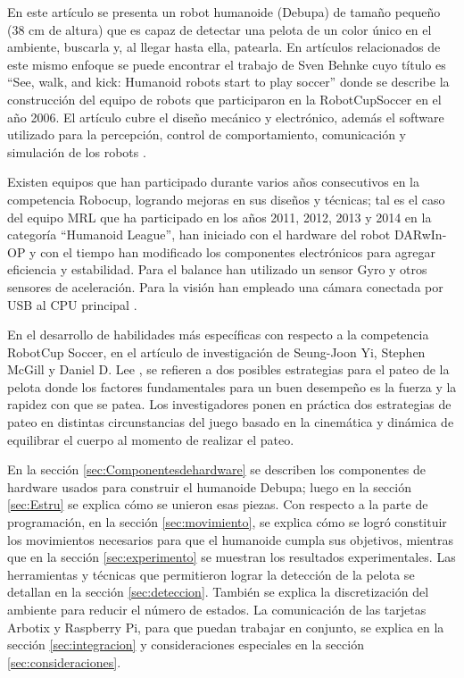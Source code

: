 \documentclass[conference, letterpaper]{IEEEtranMC1}
\begin{document}
En este artículo se presenta un robot humanoide (Debupa) de tamaño pequeño (38 cm de altura) que es capaz de detectar una pelota de un color único en el ambiente, buscarla y, al llegar hasta ella, patearla. En artículos relacionados de este mismo enfoque se puede encontrar el trabajo de Sven Behnke cuyo título es “See, walk, and kick: Humanoid robots start to play soccer” donde se describe la construcción del equipo de robots que participaron en la RobotCupSoccer en el a\~no 2006. El artículo cubre el diseño mecánico y electrónico, además el software utilizado para la percepción, control de comportamiento, comunicación y simulación de los robots \cite{paper}. 

Existen equipos que han participado durante varios años consecutivos en la competencia Robocup, logrando mejoras en sus diseños y técnicas; tal es el caso del equipo MRL que ha participado en los años 2011, 2012, 2013 y 2014 en la categoría “Humanoid League”, han iniciado con el hardware del robot DARwIn-OP y con el tiempo han modificado los componentes electrónicos para agregar eficiencia y estabilidad. Para el balance han utilizado un sensor Gyro y otros sensores de aceleración. Para la visión han empleado una cámara conectada por USB al CPU principal \cite{paper1}. 

En el desarrollo de habilidades más específicas con respecto a la competencia RobotCup Soccer, en el artículo de investigación de Seung-Joon Yi, Stephen McGill y Daniel D. Lee  \cite{paper2}, se refieren a dos posibles estrategias para el pateo de la pelota donde los factores fundamentales para un buen desempeño es la fuerza y la rapidez con que se patea. Los investigadores ponen en pr\'actica dos estrategias de pateo en distintas circunstancias del juego basado en la cinemática y dinámica de equilibrar el cuerpo al momento de realizar el pateo.

En la secci\'on \ref{sec:Componentesdehardware} se describen los componentes de hardware usados para construir el humanoide Debupa; luego en la sección \ref{sec:Estru}
 se explica cómo se unieron esas piezas. Con respecto a la parte de programación, en la secci\'on \ref{sec:movimiento}, se explica c\'omo se logró constituir los movimientos necesarios para que el humanoide cumpla sus objetivos, mientras que en la secci\'on \ref{sec:experimento} se muestran los resultados experimentales. Las herramientas y técnicas  que  permitieron lograr  la detección de la pelota se detallan en la secci\'on \ref{sec:deteccion}. También se explica la discretización del ambiente para reducir el n\'umero de estados. La comunicación de las tarjetas Arbotix y Raspberry Pi, para que puedan trabajar en conjunto, se explica en la secci\'on \ref{sec:integracion}  y consideraciones especiales en la secci\'on \ref{sec:consideraciones}. 
\end{document}
